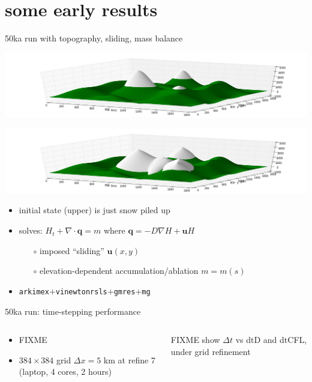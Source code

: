 \documentclass[hide notes,intlimits,usenames,dvipsnames]{beamer}
\newcommand{\Div}{\nabla\cdot}
\newcommand{\grad}{\nabla}
\begin{document}
\section{some early results}

\begin{frame}{50ka run with topography, sliding, mass balance}
\begin{center}
\includegraphics[height=0.25\textheight]{startsheet.png}

\includegraphics[height=0.25\textheight]{endsheet.png}
\end{center}

\begin{itemize}
\item initial state (upper) is just snow piled up
\item solves: $H_t + \Div \mathbf{q} = m$ where $\mathbf{q} = -D\grad H + \mathbf{u} H$
    \begin{itemize}
    \item[$\circ$] imposed ``sliding'' $\mathbf{u}(x,y)$
    \item[$\circ$] elevation-dependent accumulation/ablation $m=m(s)$
    \end{itemize}
\item \texttt{arkimex}$+$\texttt{vinewtonrsls}$+$\texttt{gmres}$+$\texttt{mg}
\end{itemize}
\end{frame}


\begin{frame}{50ka run: time-stepping performance}
\begin{columns}
\begin{column}{0.4\textwidth}
\begin{itemize}
\item FIXME
\item $384\times 384$ grid $\Delta x = 5$ km at refine 7 (laptop, 4 cores, 2 hours)
\end{itemize}
\end{column}
\begin{column}{0.6\textwidth}
FIXME  show $\Delta t$ vs dtD and dtCFL, under grid refinement
\end{column}
\end{columns}
\end{frame}
\end{document}

